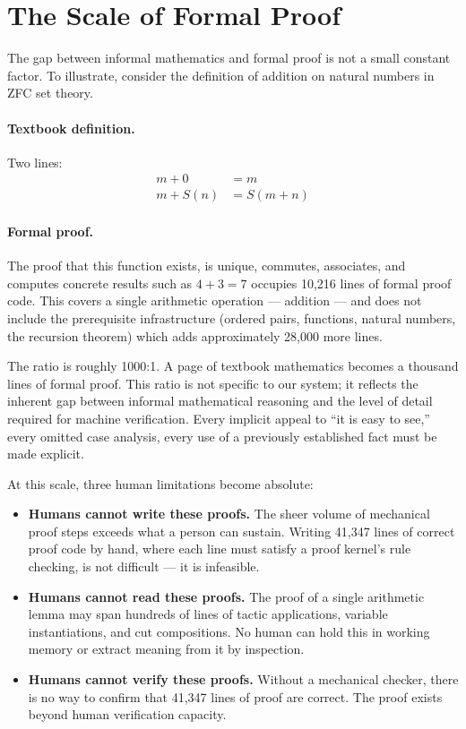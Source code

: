 \documentclass[letterpaper]{article}
\begin{document}
\section{The Scale of Formal Proof}
\label{sec:scale}

The gap between informal mathematics and formal proof is not a small constant
factor. To illustrate, consider the definition of addition on natural numbers
in ZFC set theory.

\paragraph{Textbook definition.} Two lines:
\begin{align*}
  m + 0 &= m \\
  m + S(n) &= S(m + n)
\end{align*}

\paragraph{Formal proof.} The proof that this function exists, is unique,
commutes, associates, and computes concrete results such as $4+3=7$ occupies
10,216 lines of formal proof code. This covers a single arithmetic operation
--- addition --- and does not include the prerequisite infrastructure (ordered
pairs, functions, natural numbers, the recursion theorem) which adds
approximately 28,000 more lines.

The ratio is roughly 1000:1. A page of textbook mathematics becomes a
thousand lines of formal proof. This ratio is not specific to our system; it
reflects the inherent gap between informal mathematical reasoning and the
level of detail required for machine verification. Every implicit appeal to
``it is easy to see,'' every omitted case analysis, every use of a previously
established fact must be made explicit.

At this scale, three human limitations become absolute:

\begin{itemize}
  \item \textbf{Humans cannot write these proofs.} The sheer volume of
    mechanical proof steps exceeds what a person can sustain. Writing 41,347
    lines of correct proof code by hand, where each line must satisfy a proof
    kernel's rule checking, is not difficult --- it is infeasible.
  \item \textbf{Humans cannot read these proofs.} The proof of a single
    arithmetic lemma may span hundreds of lines of tactic applications,
    variable instantiations, and cut compositions. No human can hold this in
    working memory or extract meaning from it by inspection.
  \item \textbf{Humans cannot verify these proofs.} Without a mechanical
    checker, there is no way to confirm that 41,347 lines of proof are
    correct. The proof exists beyond human verification capacity.
\end{itemize}
\end{document}
